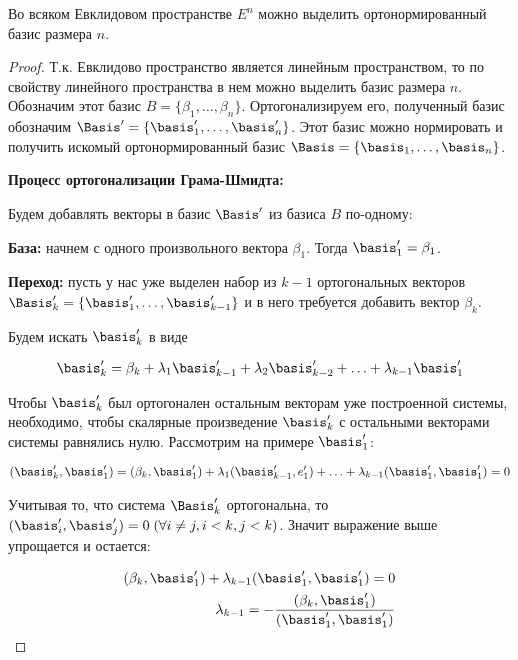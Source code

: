 \begin{theorem}\label{ort-basic}
  Во всяком Евклидовом пространстве \(E^{n}\) можно выделить ортонормированный
  базис размера \(n\).
\end{theorem}
\begin{proof}
  Т.к. Евклидово пространство является линейным пространством, то по свойству
  линейного пространства в нем можно выделить базис размера \(n\).
  Обозначим этот базис \(B = \{ \beta_{1}, \dotsc, \beta_{n} \}\).
  Ортогонализируем его, полученный базис обозначим
  \(\Basis' = \{ \basis'_{1}, \dotsc, \basis'_{n} \}\).
  Этот базис можно нормировать и получить искомый ортонормированный базис
  \(\Basis = \{ \basis_{1}, \dotsc, \basis_{n} \}\).

  \textbf{Процесс ортогонализации Грама-Шмидта:}

  Будем добавлять векторы в базис \(\Basis'\) из базиса \(B\) по-одному:

  \textbf{База:} начнем с одного произвольного вектора \(\beta_1\).
  Тогда \(\basis'_{1} = \beta_{1}\).

  \textbf{Переход:} пусть у нас уже выделен набор из \(k - 1\) ортогональных
  векторов \(\Basis'_{k} = \{ \basis'_{1}, \dotsc, \basis'_{k - 1} \}\) и в него
  требуется добавить вектор \(\beta_{k}\).

  Будем искать \(\basis'_{k}\) в виде

  \begin{align*}
    \basis'_{k}
      = \beta_{k}
      + \lambda_{1} \basis'_{k - 1}
      + \lambda_{2} \basis'_{k - 2}
      + \dotsc
      + \lambda_{k - 1} \basis'_{1}
  \end{align*}

  Чтобы \(\basis'_{k}\) был ортогонален остальным векторам уже построенной
  системы, необходимо, чтобы скалярные произведение \(\basis'_{k}\) с остальными
  векторами системы равнялись нулю. Рассмотрим на примере \(\basis'_{1}\):

  \begin{align*}
    (\basis'_{k}, \basis'_{1})
      = (\beta_{k}, \basis'_{1})
      + \lambda_{1} (\basis'_{k - 1}, e'_{1})
      + \dotsc
      + \lambda_{k - 1} (\basis'_{1}, \basis'_{1})
      = 0
  \end{align*}

  Учитывая то, что система \(\Basis'_{k}\) ортогональна, то
  \((\basis'_{i}, \basis'_{j}) = 0 \; (\forall i \neq j, i < k, j < k)\).
  Значит выражение выше упрощается и остается:

  \begin{align*}
     (\beta_{k}, \basis'_{1})
     + \lambda_{k - 1} (\basis'_{1}, \basis'_{1}) = 0 \\
     \lambda_{k - 1}
     = -\frac{(\beta_{k}, \basis'_{1})}{(\basis'_{1}, \basis'_{1})}
  \end{align*}


\end{proof}
